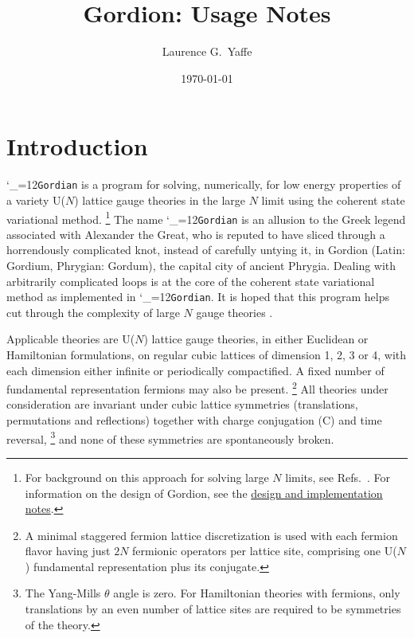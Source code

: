 \documentclass [12pt]{article}
\title
    {
    Gordion: Usage Notes
    \vspace*{-8pt}
    }
\date	{\small\today\vspace*{-30pt}}
\author	{Laurence G.~Yaffe}
\affil{%
    \small
    Department of Physics, University of Washington, Seattle WA 98195, USA
    \vspace*{-12pt}
    }%
\makeatletter
\renewcommand{\tt}{\begingroup\catcode`_=12\def\_{\string_}\tt@}
\newcommand{\tt@}[1]{\texttt{#1}\endgroup}
\makeatother
\begin{document}
\maketitle
\tableofcontents
\setlength{\parskip}{5pt plus 2pt minus 1pt}

\section {Introduction}

\tt{Gordian} is a program for solving, numerically,
for low energy properties of
a variety U($N$) lattice gauge theories in the large $N$ limit using the
coherent state variational method.%
\footnote
    {%
    For background on this approach for solving large $N$ limits,
    see Refs.~\cite{YaffeRMP, CSVAI, CSVAII,Yaffe:2026ouz}.
    For information on the design of Gordion,
    see the
    \href{https://github.com/lgyaffe/Gordion/blob/main/Doc/design.pdf}
    {design and implementation notes}.
    }
The name \tt{Gordian} is an allusion to the Greek legend
associated with Alexander the Great, who
is reputed to have sliced through a horrendously complicated
knot, instead of carefully untying it,
in Gordion (Latin: Gordium, Phrygian: Gordum),
the capital city of ancient Phrygia.
Dealing with arbitrarily complicated loops is at the
core of the coherent state variational method as
implemented in \tt{Gordian}.
It is hoped that this program helps cut through
the complexity of large $N$ gauge theories
{\large\smiley{}}.

Applicable theories are U($N$) lattice gauge theories,
in either Euclidean or Hamiltonian formulations,
on regular cubic lattices of dimension 1, 2, 3 or 4, with each
dimension either infinite or periodically compactified.
A fixed number of fundamental representation fermions
may also be present.%
\footnote
    {%
    A minimal staggered fermion lattice discretization
    is used with each fermion flavor having
    just $2N$ fermionic operators per lattice site,
    comprising one U($N$) fundamental representation
    plus its conjugate.
    }
All theories under consideration are invariant under cubic
lattice symmetries (translations, permutations and reflections)
together with charge conjugation (C) and time reversal,%
\footnote
    {%
    The Yang-Mills $\theta$ angle is zero.
    For Hamiltonian theories with fermions,
    only translations by an even number of lattice sites are
    required to be symmetries of the theory.
    }
and none of these symmetries are spontaneously broken.
\end{document}
